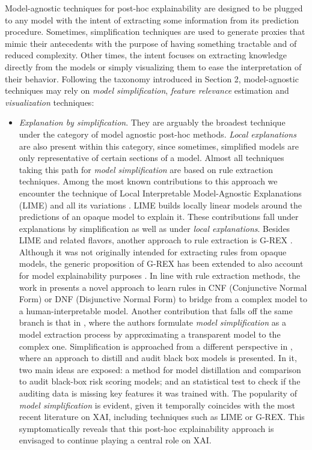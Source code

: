 \documentclass[final]{elsarticle}
\begin{document}
Model-agnostic techniques for post-hoc explainability are designed to be plugged to any model with the intent of extracting some information from its prediction procedure. Sometimes, simplification techniques are used to generate proxies that mimic their antecedents with the purpose of having something tractable and of reduced complexity. Other times, the intent focuses on extracting knowledge directly from the models or simply visualizing them to ease the interpretation of their behavior. Following the taxonomy introduced in Section 2, model-agnostic techniques may rely on \textit{model simplification}, \textit{feature relevance} estimation and \textit{visualization} techniques:
\begin{itemize}[leftmargin=*]
	\item \textit{Explanation by simplification}. They are arguably the broadest technique under the category of model agnostic post-hoc methods.  \textit{Local explanations} are also present within this category, since sometimes, simplified models are only representative of certain sections of a model. Almost all techniques taking this path for \textit{model simplification} are based on rule extraction techniques. Among the most known contributions to this approach we encounter the technique of Local Interpretable Model-Agnostic Explanations (LIME) \cite{ribeiro2016trust} and all its variations \cite{ModelAgnosticMusic,NothingElseMatters}. LIME builds locally linear models around the predictions of an opaque model to explain it. These contributions fall under explanations by simplification as well as under \textit{local explanations}. Besides LIME and related flavors, another approach to rule extraction is G-REX \cite{GREX}. Although it was not originally intended for extracting rules from opaque models, the generic proposition of G-REX has been extended to also account for model explainability purposes \cite{ RuleExtractionInThere,AccVsComp}. In line with rule extraction methods, the work in \cite{InterpretableTwoLevel} presents a novel approach to learn rules in CNF (Conjunctive Normal Form) or DNF (Disjunctive Normal Form) to bridge from a complex model to a human-interpretable model. Another contribution that falls off the same branch is that in \cite{InterpretabilityViaModelExtraction}, where the authors formulate \textit{model simplification} as a model extraction process by approximating a transparent model to the complex one. Simplification is approached from a different perspective in \cite{DistillAndCompare}, where an approach to distill and audit black box models is presented. In it, two main ideas are exposed: a method for model distillation and comparison to audit black-box risk scoring models; and an statistical test to check if the auditing data is missing key features it was trained with. 
	The popularity of \textit{model simplification} is evident, given it temporally coincides with the most recent literature on XAI, including techniques such as LIME or G-REX. This symptomatically reveals that this post-hoc explainability approach is envisaged to continue playing a central role on XAI.
	

\end{itemize}
\end{document}

